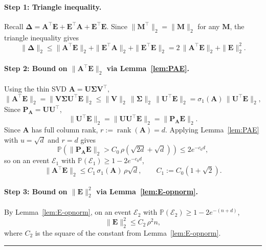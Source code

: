 \documentclass{article}
\newcommand{\twonorm}[1]{\|#1\|_2}
\newcommand{\pr}[1]{\mbox{}\mathbb{P}\left(#1\right)}
\newcommand{\ts}{\top}
\newcommand{\Ab}{\mathbf{A}}
\newcommand{\Eb}{\mathbf{E}}
\newcommand{\Mb}{\mathbf{M}}
\newcommand{\Pb}{\mathbf{P}}
\newcommand{\Ub}{\mathbf{U}}
\newcommand{\Vb}{\mathbf{V}}
\newcommand{\Ecal}{\mathcal{E}}
\newcommand{\BlackBox}{\rule{1.5ex}{1.5ex}}  %
\newenvironment{proof}{\par\noindent{\bf Proof\ }}{\hfill\BlackBox\par\medskip}
\newcommand{\rank}{\mathop{\mathrm{rank}}}
\newcommand{\rbr}[1]{\left(#1\right)}
\newcommand{\Sigmab}{\mathbf{\Sigma}}
\newcommand{\Deltab}{\boldsymbol{\Delta}}
\begin{document}
\begin{proof}
\paragraph{Step 1: Triangle inequality.}
Recall $\Deltab = \Ab^\ts \Eb + \Eb^\ts \Ab + \Eb^\ts \Eb$. Since $\twonorm{\Mb^\ts} = \twonorm{\Mb}$ for any $\Mb$, the triangle inequality gives
\begin{equation}\label{eq:Delta-triangle}
    \twonorm{\Deltab} \le \twonorm{\Ab^\ts \Eb} + \twonorm{\Eb^\ts \Ab} + \twonorm{\Eb^\ts \Eb} = 2\,\twonorm{\Ab^\ts \Eb} + \twonorm{\Eb}^2.
\end{equation}

\paragraph{Step 2: Bound on $\twonorm{\Ab^\ts \Eb}$ via Lemma~\ref{lem:PAE}.}
Using the thin SVD $\Ab = \Ub \Sigmab \Vb^\ts,$
\begin{equation*}
    \twonorm{\Ab^\ts \Eb} = \twonorm{\Vb\Sigmab\Ub^\ts \Eb} \le \twonorm{\Vb}\,\twonorm{\Sigmab}\,\twonorm{\Ub^\ts \Eb} = \sigma_1(\Ab)\,\twonorm{\Ub^\ts \Eb},
\end{equation*}
Since $\Pb_\Ab = \Ub\Ub^\ts$,
\begin{equation*}
    \twonorm{\Ub^\ts \Eb} = \twonorm{\Ub\Ub^\ts \Eb} = \twonorm{\Pb_\Ab \Eb}.
\end{equation*}
Since $\Ab$ has full column rank, $r := \rank(\Ab) = d$. Applying Lemma~\ref{lem:PAE} with $u = \sqrt{d}$ and $r = d$ gives
\begin{equation*}
    \pr{\twonorm{\Pb_\Ab \Eb} > C_0\,\rho\rbr{\sqrt{2d} + \sqrt{d}}} \le 2 e^{-c_0 d},
\end{equation*}
so on an event $\Ecal_1$ with $\pr{\Ecal_1} \ge 1 - 2 e^{-c_0 d}$,
\begin{equation}\label{eq:AE-bound}
    \twonorm{\Ab^\ts \Eb} \le C_1\,\sigma_1(\Ab)\,\rho\sqrt{d}, \qquad C_1 := C_0(1 + \sqrt{2}).
\end{equation}

\paragraph{Step 3: Bound on $\twonorm{\Eb}^2$ via Lemma~\ref{lem:E-opnorm}.}
By Lemma~\ref{lem:E-opnorm}, on an event $\Ecal_2$ with $\pr{\Ecal_2} \ge 1 - 2 e^{-(n+d)}$,
\begin{equation}\label{eq:E-square-bound}
    \twonorm{\Eb}^2 \le C_2\,\rho^2 n,
\end{equation}
where $C_2$ is the square of the constant from Lemma~\ref{lem:E-opnorm}.


\end{proof}
\end{document}
